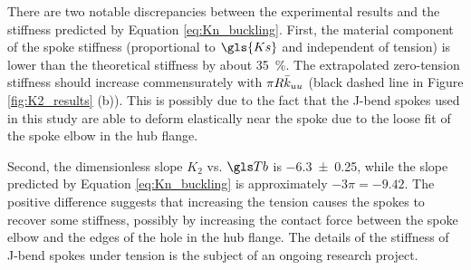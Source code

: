 \documentclass[\rootdir/thesis.tex]{subfiles}
\begin{document}
There are two notable discrepancies between the experimental results and the stiffness predicted by Equation \eqref{eq:Kn_buckling}. First, the material component of the spoke stiffness (proportional to $\gls{Ks}$ and independent of tension) is lower than the theoretical stiffness by about \SI{35}{\percent}. The extrapolated zero-tension stiffness should increase commensurately with $\pi R\bar{k}_{uu}$ (black dashed line in Figure \ref{fig:K2_results} (b)). This is possibly due to the fact that the J-bend spokes used in this study are able to deform elastically near the spoke due to the loose fit of the spoke elbow in the hub flange.

Second, the dimensionless slope $K_2$ vs. $\Tb$ is \num{-6.3+-0.25}, while the slope predicted by Equation \eqref{eq:Kn_buckling} is approximately $-3\pi = -9.42$. The positive difference suggests that increasing the tension causes the spokes to recover some stiffness, possibly by increasing the contact force between the spoke elbow and the edges of the hole in the hub flange. The details of the stiffness of J-bend spokes under tension is the subject of an ongoing research project.
\end{document}
